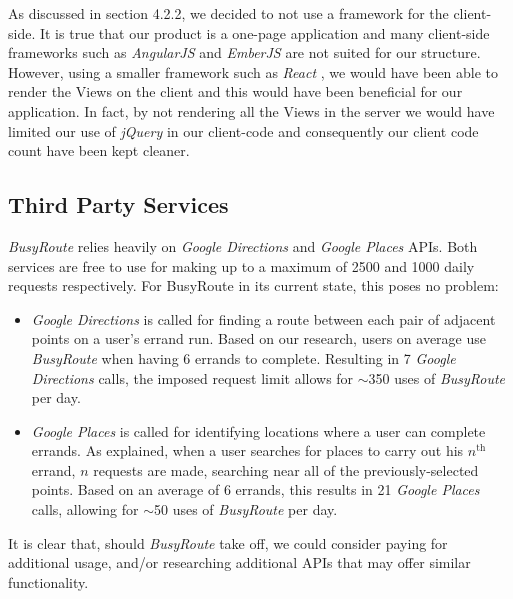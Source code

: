 \documentclass[a4paper, 10pt]{report}
\begin{document}
As discussed in section 4.2.2, we decided to not use a framework for the client-side. It is true that our product is a one-page application and many client-side frameworks such as \textit{AngularJS} and \textit{EmberJS} are not suited for our structure. However, using a smaller framework such as \textit{React} \cite{react}, we would have been able to render the Views on the client and this would have been beneficial for our application. In fact, by not rendering all the Views in the server we would have limited our use of \textit{jQuery} in our client-code and consequently our client code count have been kept cleaner.

\subsection{Third Party Services}
\textit{BusyRoute} relies heavily on \textit{Google Directions} and \textit{Google Places} APIs. Both services are free to use for making up to a maximum of 2500 and 1000 daily requests respectively. For BusyRoute in its current state, this poses no problem:
\begin{itemize}
	\item \textit{Google Directions }is called for finding a route between each pair of adjacent points on a user’s errand run. Based on our research, users on average use \textit{BusyRoute }when having 6 errands to complete. Resulting in 7 \textit{Google Directions }calls, the imposed request limit allows for $\sim$350 uses of \textit{BusyRoute }per day.
	\item \textit{Google Places }is called for identifying locations where a user can complete errands. As explained, when a user searches for places to carry out his $n^{\text{th}}$ errand, $n$ requests are made, searching near all of the previously-selected points. Based on an average of 6 errands, this results in 21 \textit{Google Places }calls, allowing for $\sim$50 uses of \textit{BusyRoute }per day.
\end{itemize}
It is clear that, should \textit{BusyRoute }take off, we could consider paying for additional usage, and/or researching additional APIs that may offer similar functionality.
\end{document}
